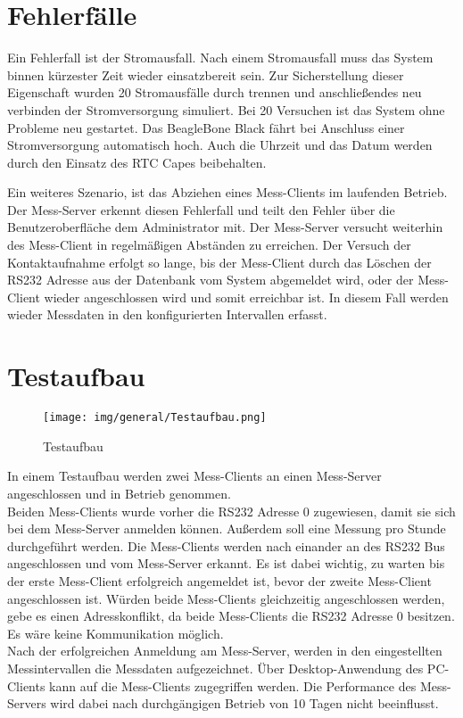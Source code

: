 \section{Fehlerfälle}
Ein Fehlerfall ist der Stromausfall. Nach einem Stromausfall muss das System binnen kürzester Zeit wieder einsatzbereit sein. Zur Sicherstellung dieser Eigenschaft wurden 20 Stromausfälle durch trennen und anschließendes neu verbinden der Stromversorgung simuliert. Bei 20 Versuchen ist das System ohne Probleme neu gestartet. Das BeagleBone Black fährt bei Anschluss einer Stromversorgung automatisch hoch. Auch die Uhrzeit und das Datum werden durch den Einsatz des RTC Capes beibehalten.\ 

Ein weiteres Szenario, ist das Abziehen eines Mess-Clients im laufenden Betrieb. Der Mess-Server erkennt diesen Fehlerfall und teilt den Fehler über die Benutzeroberfläche dem Administrator mit. Der Mess-Server versucht weiterhin des Mess-Client in regelmäßigen Abständen zu erreichen. Der Versuch der Kontaktaufnahme erfolgt so lange, bis der Mess-Client durch das Löschen der RS232 Adresse aus der Datenbank vom System abgemeldet wird, oder der Mess-Client wieder angeschlossen wird und somit erreichbar ist. In diesem Fall werden wieder Messdaten in den konfigurierten Intervallen erfasst.

\section{Testaufbau}

\begin{figure}[H]
\begin{center}
\texttt{[image: img/general/Testaufbau.png]}
\caption{Testaufbau}
\label{figure_Testaufbau}
\end{center}
\end{figure}

In einem Testaufbau werden zwei Mess-Clients an einen Mess-Server angeschlossen und in Betrieb genommen. \\
Beiden Mess-Clients wurde vorher die RS232 Adresse 0 zugewiesen, damit sie sich bei dem Mess-Server anmelden können. Außerdem soll eine Messung pro Stunde durchgeführt werden. Die Mess-Clients werden nach einander an des RS232 Bus angeschlossen und vom Mess-Server erkannt. Es ist dabei wichtig, zu warten bis der erste Mess-Client erfolgreich angemeldet ist, bevor der zweite Mess-Client angeschlossen ist. Würden beide Mess-Clients gleichzeitig angeschlossen werden, gebe es einen Adresskonflikt, da beide Mess-Clients die RS232 Adresse 0 besitzen. Es wäre keine Kommunikation möglich.\\
Nach der erfolgreichen Anmeldung am Mess-Server, werden in den eingestellten Messintervallen die Messdaten aufgezeichnet. Über Desktop-Anwendung des PC-Clients kann auf die Mess-Clients zugegriffen werden. Die Performance des Mess-Servers wird dabei nach durchgängigen Betrieb von 10 Tagen nicht beeinflusst. 

